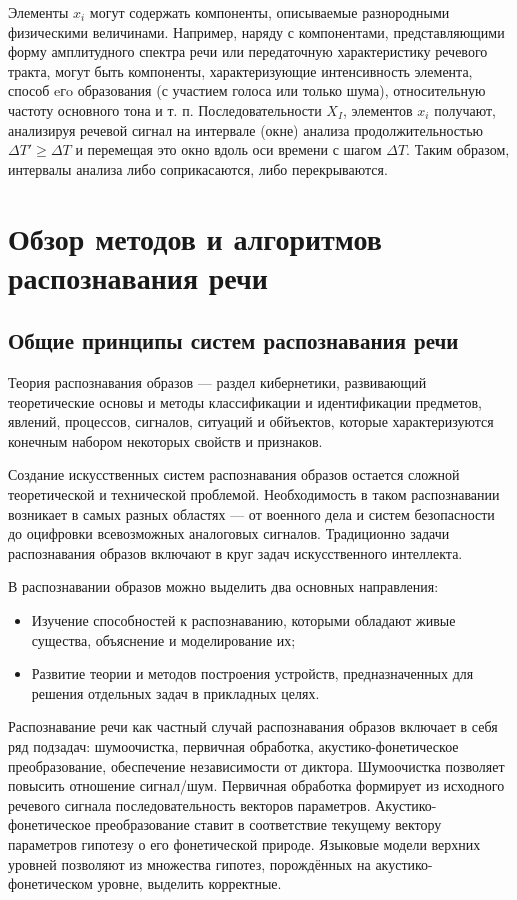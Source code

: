 \documentclass[a4paper,14pt,russian,utf8,nocolumnsxix,nocolumnxxxi,nocolumnxxxii]{eskdtext}
\begin{document}
Элементы $x_{i}$ могут содержать компоненты, описываемые разнородными физическими величинами. Например, наряду с компонентами, представляющими форму амплитудного спектра речи или передаточную характеристику речевого тракта, могут быть компоненты, характеризующие интенсивность элемента, способ eгo образования (с участием голоса или только шума), относительную частоту основного тона и т. п. 
Последовательности $X_{I}$, элементов $x_{i}$ получают, анализируя речевой сигнал на интервале (окне) анализа продолжительностью $\Delta T'\geq \Delta T$ и перемещая это окно вдоль оси времени с шагом $\Delta T$. Таким образом, интервалы анализа либо соприкасаются, либо перекрываются.\cite{vincuk}
\pagebreak

\section [Обзор методов и алгоритмов распознавания речи]{Обзор методов и алгоритмов\\ распознавания речи}
\setcounter{figure}{0} 

\subsection{Общие принципы систем распознавания речи}
Теория распознавания образов --- раздел кибернетики, развивающий теоретические основы и методы классификации и идентификации предметов, явлений, процессов, сигналов, ситуаций и обйъектов, которые характеризуются конечным набором некоторых свойств и признаков.

Создание искусственных систем распознавания образов остается сложной теоретической и технической проблемой. Необходимость в таком распознавании возникает в самых разных областях --- от военного дела и систем безопасности до оцифровки всевозможных аналоговых сигналов. Традиционно задачи распознавания образов включают в круг задач искусственного интеллекта.

В распознавании образов можно выделить два основных направления\cite{gorelik}:
\begin{itemize}
\item
Изучение способностей к распознаванию, которыми обладают живые существа, объяснение и моделирование их;
\item
Развитие теории и методов построения устройств, предназначенных для решения отдельных задач в прикладных целях.
\end{itemize}

Распознавание речи как частный случай распознавания образов включает в себя ряд подзадач: шумоочистка,  первичная обработка, акустико-фонетическое преобразование, обеспечение независимости от диктора. Шумоочистка позволяет повысить отношение сигнал/шум. Первичная обработка формирует из исходного речевого сигнала последовательность векторов параметров.  Акустико-фонетичес\-кое преобразование ставит в соответствие текущему вектору параметров гипотезу о его фонетической природе. Языковые модели верхних уровней позволяют из множества гипотез, порождённых на акустико-фонетическом уровне, выделить корректные.
\end{document}
